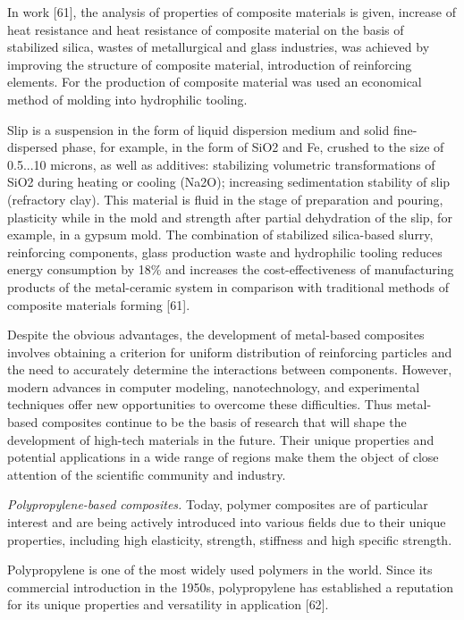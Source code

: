 \begin{multicols}{2}
In work {[}61{]}, the analysis of properties of composite materials is
given, increase of heat resistance and heat resistance of composite
material on the basis of stabilized silica, wastes of metallurgical and
glass industries, was achieved by improving the structure of composite
material, introduction of reinforcing elements. For the production of
composite material was used an economical method of molding into
hydrophilic tooling.

Slip is a suspension in the form of liquid dispersion medium and solid
fine-dispersed phase, for example, in the form of SiO2 and Fe, crushed
to the size of 0.5...10 microns, as well as additives: stabilizing
volumetric transformations of SiO2 during heating or cooling (Na2O);
increasing sedimentation stability of slip (refractory clay). This
material is fluid in the stage of preparation and pouring, plasticity
while in the mold and strength after partial dehydration of the slip,
for example, in a gypsum mold. The combination of stabilized
silica-based slurry, reinforcing components, glass production waste and
hydrophilic tooling reduces energy consumption by 18\% and increases the
cost-effectiveness of manufacturing products of the metal-ceramic system
in comparison with traditional methods of composite materials forming
{[}61{]}.

Despite the obvious advantages, the development of metal-based
composites involves obtaining a criterion for uniform distribution of
reinforcing particles and the need to accurately determine the
interactions between components. However, modern advances in computer
modeling, nanotechnology, and experimental techniques offer new
opportunities to overcome these difficulties. Thus metal-based
composites continue to be the basis of research that will shape the
development of high-tech materials in the future. Their unique
properties and potential applications in a wide range of regions make
them the object of close attention of the scientific community and
industry.

\emph{Polypropylene-based composites.} Today, polymer composites are of
particular interest and are being actively introduced into various
fields due to their unique properties, including high elasticity,
strength, stiffness and high specific strength.

Polypropylene is one of the most widely used polymers in the world.
Since its commercial introduction in the 1950s, polypropylene has
established a reputation for its unique properties and versatility in
application {[}62{]}.


\end{multicols}
